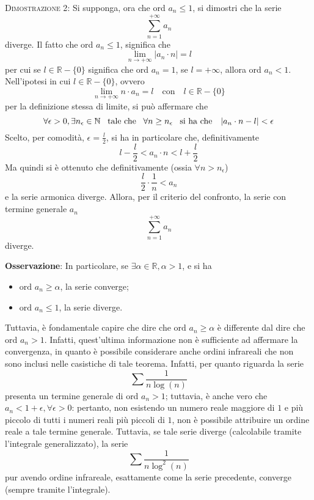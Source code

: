 \documentclass[a4paper]{extarticle}
\begin{document}
\vspace{2em}
\noindent
\normalfont \normalsize
\textsc{Dimostrazione 2}: Si supponga, ora che ord $a_n \leq 1$, si dimostri che la serie
\[\sum_{n=1}^{+\infty}a_n\]
diverge. Il fatto che ord $a_n \leq 1$, significa che
\[\lim_{n \to +\infty} \left \vert a_n \cdot n \right \vert = l\]
per cui se $l \in \mathbb{R} - \{0\}$ significa che ord $a_n = 1$, se $l = +\infty$, allora ord $a_n < 1$. Nell'ipotesi in cui $l \in \mathbb{R} - \{0\}$, ovvero
\[\lim_{n \to +\infty} n \cdot a_n = l \hspace{1em} \text{con} \hspace{1em} l \in \mathbb{R} - \{0\}\]
per la definizione stessa di limite, si può affermare che
\[\forall \epsilon > 0, \exists n_\epsilon \in \mathbb{N} \hspace{0.5em} \text{ tale che } \hspace{0.5em} \forall n \geq n_\epsilon \hspace{0.5em} \text{ si ha che } \hspace{0.5em} \left \vert a_n \cdot n-l \right \vert < \epsilon\]
Scelto, per comodità, $\epsilon=\frac{l}{2}$, si ha in particolare che, definitivamente 
\[l-\frac{l}{2} < a_n \cdot n < l+\frac{l}{2}\]
Ma quindi si è ottenuto che definitivamente (ossia $\forall n > n_\epsilon$)
\[\frac{l}{2} \cdot \frac{1}{n} < a_n\]
e la serie armonica diverge. Allora, per il criterio del confronto, la serie con termine generale $a_n$
\[\sum_{n=1}^{+\infty} a_n\]
diverge.

\vspace{2em}
\noindent
\textbf{Osservazione}: In particolare, se $\exists \alpha \in \mathbb{R}, \alpha>1$, e si ha
\begin{itemize}
    \item $\text{ord } a_n \geq \alpha$, la serie converge;
    \item $\text{ord } a_n \leq 1$, la serie diverge.
\end{itemize}
Tuttavia, è fondamentale capire che dire che $\text{ord } a_n \geq \alpha$ è differente dal dire che $\text{ord } a_n > 1$. Infatti, quest'ultima informazione non è sufficiente ad affermare la convergenza, in quanto è possibile considerare anche ordini infrareali che non sono inclusi nelle casistiche di tale teorema. Infatti, per quanto riguarda la serie
\[\sum \frac{1}{n \log(n)}\]
presenta un termine generale di ord $a_n > 1$; tuttavia, è anche vero che $a_n < 1 + \epsilon, \forall \epsilon > 0$: pertanto, non esistendo un numero reale maggiore di $1$ e più piccolo di tutti i numeri reali più piccoli di $1$, non è possibile attribuire un ordine reale a tale termine generale. Tuttavia, se tale serie diverge (calcolabile tramite l'integrale generalizzato), la serie 
\[\sum \frac{1}{n \log^2(n)}\]
pur avendo ordine infrareale, esattamente come la serie precedente, converge (sempre tramite l'integrale).
\end{document}
